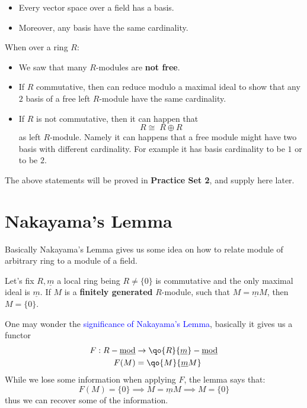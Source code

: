 \begin{theorem}
	\leavevmode
	\begin{itemize}
		\item Every vector space over a field has a basis.
		\item Moreover, any basis have the same cardinality.
	\end{itemize}
\end{theorem}
When over a ring \( R \):
\begin{itemize}
	\item We saw that many \( R \)-modules are \textbf{not free}.
	\item If \( R \) commutative, then can reduce modulo a maximal ideal to show that any \( 2 \)
	      basis of a free left \( R \)-module have the same cardinality.
	\item If \( R \) is not commutative, then it can happen that
	      \[
		      R \cong \; R \oplus R
	      \]
	      as left \( R \)-module. Namely it can happens that a free module might have two basis with
	      different cardinality. For example it has basis cardinality to be \( 1 \) or to be \( 2 \).
\end{itemize}
The above statements will be proved in \textbf{Practice Set 2}, and supply here later.

\section{Nakayama's Lemma}
Basically Nakayama's Lemma gives us some idea on how to relate module of arbitrary ring to a module
of a field.

\begin{lemma}
	\label{lem:nakayama}
	Let's fix \( R, \underline{m} \) a local ring being \( R \ne \{0\} \) is commutative and the only
	maximal ideal is \( \underline{m} \). If \( M \) is a \textbf{finitely generated} \( R \)-module, such that
	\( M = \underline{m} M \), then \( M = \{0\} \).
\end{lemma}
One may wonder the \textcolor{blue}{significance of Nakayama's Lemma}, basically it gives us a
functor
\[
	\begin{aligned}
		F: R-\underline{\text{mod}} & \to \qo{R}{\underline{m}}-\underline{\text{mod}} \\
		F(M)                        & = \qo{M}{\underline{m}M}
	\end{aligned}
\]
While we lose some information when applying \( F \), the lemma says that:
\[
	F(M) = \{0\} \implies M = \underline{m} M \implies M = \{0\}
\]
thus we can recover some of the information.

